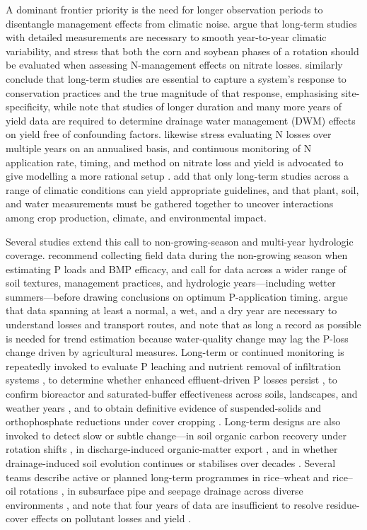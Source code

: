 \documentclass[11pt]{article}
\begin{document}
A dominant frontier priority is the need for longer observation periods to disentangle management effects from climatic noise. \textcite{Randall2003,Randall2005} argue that long-term studies with detailed measurements are necessary to smooth year-to-year climatic variability, and stress that both the corn and soybean phases of a rotation should be evaluated when assessing N-management effects on nitrate losses. \textcite{Waring2024} similarly conclude that long-term studies are essential to capture a system's response to conservation practices and the true magnitude of that response, emphasising site-specificity, while \textcite{Cooke2012} note that studies of longer duration and many more years of yield data are required to determine drainage water management (DWM) effects on yield free of confounding factors. \textcite{Pittelkow2017} likewise stress evaluating N losses over multiple years on an annualised basis, and continuous monitoring of N application rate, timing, and method on nitrate loss and yield is advocated to give modelling a more rational setup \parencite{Jeong2018}. \textcite{RANDALL1995} add that only long-term studies across a range of climatic conditions can yield appropriate guidelines, and that plant, soil, and water measurements must be gathered together to uncover interactions among crop production, climate, and environmental impact.

Several studies extend this call to non-growing-season and multi-year hydrologic coverage. \textcite{VanEsbroeck2016} recommend collecting field data during the non-growing season when estimating P loads and BMP efficacy, and call for data across a wider range of soil textures, management practices, and hydrologic years---including wetter summers---before drawing conclusions on optimum P-application timing. \textcite{vanderSalm2012} argue that data spanning at least a normal, a wet, and a dry year are necessary to understand losses and transport routes, and \textcite{Ulén2007} note that as long a record as possible is needed for trend estimation because water-quality change may lag the P-loss change driven by agricultural measures. Long-term or continued monitoring is repeatedly invoked to evaluate P leaching and nutrient removal of infiltration systems \parencite{Duan2015}, to determine whether enhanced effluent-driven P losses persist \parencite{Monaghan2004}, to confirm bioreactor and saturated-buffer effectiveness across soils, landscapes, and weather years \parencite{Jaynes2019}, and to obtain definitive evidence of suspended-solids and orthophosphate reductions under cover cropping \parencite{SalcedaGonzalez2025}. Long-term designs are also invoked to detect slow or subtle change---in soil organic carbon recovery under rotation shifts \parencite{Kumar2014}, in discharge-induced organic-matter export \parencite{Manninen2023}, and in whether drainage-induced soil evolution continues or stabilises over decades \parencite{Frison2009}. Several teams describe active or planned long-term programmes in rice--wheat and rice--oil rotations \parencite{Qi2025b}, in subsurface pipe and seepage drainage across diverse environments \parencite{Liu2025b,Liu2025c}, and note that four years of data are insufficient to resolve residue-cover effects on pollutant losses and yield \parencite{Thoma2005,Acharya2019b}.
\end{document}
